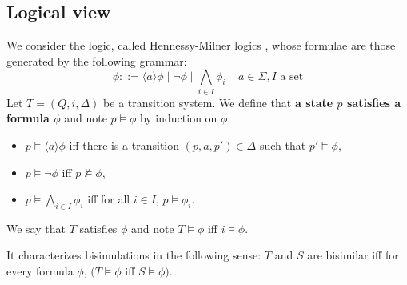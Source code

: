 		 \subsection{Logical view}
		 \label{subsec:bilo}
		 
		 We consider the logic, called Hennessy-Milner logics \cite{hennessy80}, whose formulae are those generated by the following grammar:
		 $$\phi ::= \langle a \rangle \phi \mid \neg\phi \mid \bigwedge\limits_{i \in I} \phi_i ~~~~~ a \in \Sigma, I\text{ a set}$$
		 Let $T = (Q,i, \Delta)$ be a transition system. We define that \textbf{a state $p$ satisfies a formula $\phi$} and note $p \vDash \phi$ by induction on $\phi$:
		 \begin{itemize}
		 	\item $p \vDash \langle a \rangle \phi$ iff there is a transition $(p,a,p') \in \Delta$ such that $p' \vDash \phi$,
			\item $p \vDash \neg \phi$ iff $p \not\vDash\phi$,
			\item $p \vDash \bigwedge\limits_{i \in I} \phi_i$ iff for all $i \in I$, $p \vDash \phi_i$.
		\end{itemize}
		We say that $T$ satisfies $\phi$ and note $T \vDash \phi$ iff $i \vDash \phi$.
		
		It characterizes bisimulations in the following sense: $T$ and $S$ are bisimilar iff for every formula $\phi$, $(T \vDash \phi$ iff $S \vDash \phi)$. 
		
		 

